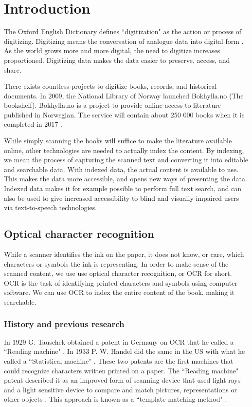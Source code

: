 
\chapter{Introduction}
The Oxford English Dictionary defines ``digitization" as the action or process of digitizing. Digitizing means the conversation of analogue data into digital form \cite{misc-oed-digitization}. As the world grows more and more digital, the need to digitize increases proportioned. Digitizing data makes the data easier to preserve, access, and share.

There exists countless projects to digitize books, records, and historical documents. In 2009, the National Library of Norway launched Bokhylla.no (The bookshelf). Bokhylla.no is a project to provide online access to literature published in Norwegian. The service will contain about 250 000 books when it is completed in 2017 \cite{misc-nb-digial-library}.

While simply scanning the books will suffice to make the literature available online, other technologies are needed to actually index the content. By indexing, we mean the process of capturing the scanned text and converting it into editable and searchable data. With indexed data, the actual content is available to use. This makes the data more accessible, and opens new ways of presenting the data. Indexed data makes it for example possible to perform full text search, and can also be used to give increased accessibility to blind and visually impaired users via text-to-speech technologies.

\section{Optical character recognition}
While a scanner identifies the ink on the paper, it does not know, or care, which characters or symbols the ink is representing. In order to make sense of the scanned content, we use use optical character recognition, or OCR for short. OCR is the task of identifying printed characters and symbols using computer software. We can use OCR to index the entire content of the book, making it searchable.

\subsection{History and previous research}
In 1929 G. Tauschek obtained a patent in Germany on OCR that he called a ``Reading machine" \cite{misc-patent-tauschek}. In 1933 P. W. Handel did the same in the US with what he called a ``Statistical machine" \cite{misc-patent-handel}. These two patents are the first machines that could recognize characters written printed on a paper. The ``Reading machine" patent described it as an improved form of scanning device that used light rays and a light sensitive device to compare and match pictures, representations or other objects \cite{misc-tauschek1935reading}. This approach is known as a ``template matching method" \cite{article-mori1992historical}. 

